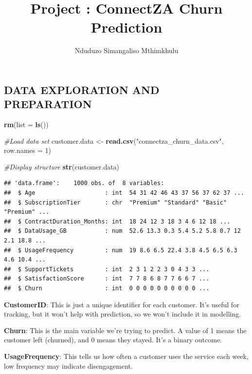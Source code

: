 \documentclass[
]{article}
\title{Project : ConnectZA Churn Prediction}
\author{Nduduzo Simangaliso Mthimkhulu}
\date{}
\newenvironment{Shaded}{\begin{snugshade}}{\end{snugshade}}
\newcommand{\AttributeTok}[1]{\textcolor[rgb]{0.13,0.29,0.53}{#1}}
\newcommand{\CommentTok}[1]{\textcolor[rgb]{0.56,0.35,0.01}{\textit{#1}}}
\newcommand{\DecValTok}[1]{\textcolor[rgb]{0.00,0.00,0.81}{#1}}
\newcommand{\FunctionTok}[1]{\textcolor[rgb]{0.13,0.29,0.53}{\textbf{#1}}}
\newcommand{\NormalTok}[1]{#1}
\newcommand{\OtherTok}[1]{\textcolor[rgb]{0.56,0.35,0.01}{#1}}
\newcommand{\StringTok}[1]{\textcolor[rgb]{0.31,0.60,0.02}{#1}}
\begin{document}
\maketitle

\newpage

\hypertarget{data-exploration-and-preparation}{%
\subsection{DATA EXPLORATION AND
PREPARATION}\label{data-exploration-and-preparation}}

\begin{Shaded}
\begin{Highlighting}[]
\FunctionTok{rm}\NormalTok{(}\AttributeTok{list =} \FunctionTok{ls}\NormalTok{())}

\CommentTok{\#Load data set}
\NormalTok{customer.data }\OtherTok{\textless{}{-}} \FunctionTok{read.csv}\NormalTok{(}\StringTok{"connectza\_churn\_data.csv"}\NormalTok{, }\AttributeTok{row.names =} \DecValTok{1}\NormalTok{)}

\CommentTok{\#Display structure}
\FunctionTok{str}\NormalTok{(customer.data)}
\end{Highlighting}
\end{Shaded}

\begin{verbatim}
## 'data.frame':    1000 obs. of  8 variables:
##  $ Age                    : int  54 31 42 46 43 37 56 37 62 37 ...
##  $ SubscriptionTier       : chr  "Premium" "Standard" "Basic" "Premium" ...
##  $ ContractDuration_Months: int  18 24 12 3 18 3 4 6 12 18 ...
##  $ DataUsage_GB           : num  52.6 13.3 0.3 5.4 5.2 5.8 0.7 12 2.1 18.8 ...
##  $ UsageFrequency         : num  19 8.6 6.5 22.4 3.8 4.5 6.5 6.3 4.6 10.4 ...
##  $ SupportTickets         : int  2 3 1 2 2 3 0 4 3 3 ...
##  $ SatisfactionScore      : int  7 7 8 6 8 7 7 6 6 7 ...
##  $ Churn                  : int  0 0 0 0 0 0 0 0 0 0 ...
\end{verbatim}

\hfill\break
\textbf{CustomerID}: This is just a unique identifier for each customer.
It's useful for tracking, but it won't help with prediction, so we won't
include it in modelling.

\textbf{Churn}: This is the main variable we're trying to predict. A
value of 1 means the customer left (churned), and 0 means they stayed.
It's a binary outcome.

\textbf{UsageFrequency}: This tells us how often a customer uses the
service each week, low frequency may indicate disengagement.
\end{document}
